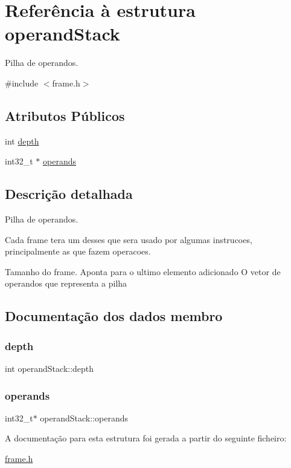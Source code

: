 \hypertarget{structoperand_stack}{}\section{Referência à estrutura operand\+Stack}
\label{structoperand_stack}


Pilha de operandos.  




{\ttfamily \#include $<$frame.\+h$>$}

\subsection*{Atributos Públicos}
\begin{DoxyCompactItemize}
\item 
int \hyperlink{structoperand_stack_a70c46f6413f90e649d4cac0894b1586f}{depth}
\item 
int32\+\_\+t $\ast$ \hyperlink{structoperand_stack_a3398df9dd2a40d256ef4c97137fe29a0}{operands}
\end{DoxyCompactItemize}


\subsection{Descrição detalhada}
Pilha de operandos. 

Cada frame tera um desses que sera usado por algumas instrucoes, principalmente as que fazem operacoes.

Tamanho do frame. Aponta para o ultimo elemento adicionado  O vetor de operandos que representa a pilha 

\subsection{Documentação dos dados membro}
\mbox{\label{structoperand_stack_a70c46f6413f90e649d4cac0894b1586f}} 
\subsubsection{\texorpdfstring{depth}{depth}}
{\footnotesize\ttfamily int operand\+Stack\+::depth}

\mbox{\label{structoperand_stack_a3398df9dd2a40d256ef4c97137fe29a0}} 
\subsubsection{\texorpdfstring{operands}{operands}}
{\footnotesize\ttfamily int32\+\_\+t$\ast$ operand\+Stack\+::operands}



A documentação para esta estrutura foi gerada a partir do seguinte ficheiro\+:\begin{DoxyCompactItemize}
\item 
\hyperlink{frame_8h}{frame.\+h}\end{DoxyCompactItemize}
